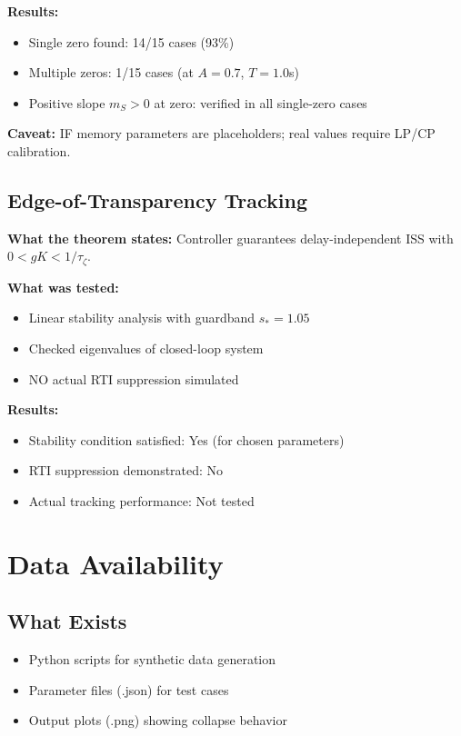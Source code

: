 \documentclass[11pt]{article}
\begin{document}
\textbf{Results:}
\begin{itemize}
    \item Single zero found: 14/15 cases (93\%)
    \item Multiple zeros: 1/15 cases (at $A = 0.7$, $T = 1.0$s)
    \item Positive slope $m_S > 0$ at zero: verified in all single-zero cases
\end{itemize}

\textbf{Caveat:} IF memory parameters are placeholders; real values require LP/CP calibration.

\subsection{Edge-of-Transparency Tracking}

\textbf{What the theorem states:} Controller guarantees delay-independent ISS with $0 < gK < 1/\tau_\zeta$.

\textbf{What was tested:}
\begin{itemize}
    \item Linear stability analysis with guardband $s_* = 1.05$
    \item Checked eigenvalues of closed-loop system
    \item NO actual RTI suppression simulated
\end{itemize}

\textbf{Results:}
\begin{itemize}
    \item Stability condition satisfied: Yes (for chosen parameters)
    \item RTI suppression demonstrated: No
    \item Actual tracking performance: Not tested
\end{itemize}

\section{Data Availability}

\subsection{What Exists}
\begin{itemize}
    \item Python scripts for synthetic data generation
    \item Parameter files (.json) for test cases
    \item Output plots (.png) showing collapse behavior
\end{itemize}
\end{document}
